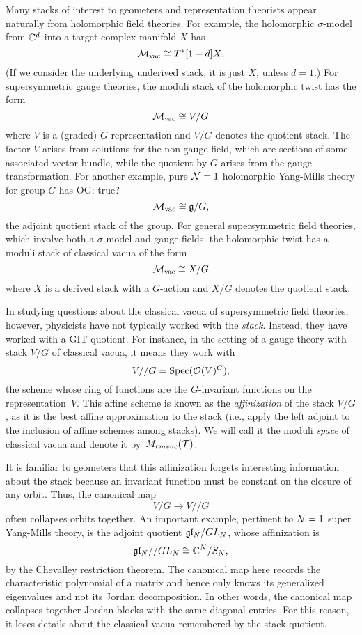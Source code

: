 \documentclass[11pt]{amsart}
\def\Spec{\text{Spec}}
\def\owen#1{{\textcolor{violet!65!black}{OG: {#1}}}}
\begin{document}
Many stacks of interest to geometers and representation theorists appear naturally from holomorphic field theories.
For example, the holomorphic $\sigma$-model from $\mathbb C^d$ into a target complex manifold $X$ has
\[
\mathcal M_{\rm vac} \cong T^*[1-d]X.
\]
(If we consider the underlying underived stack, it is just $X$, unless $d = 1$.)
For supersymmetric gauge theories, the moduli stack of the holomorphic twist has the form
\[
\mathcal M_{\rm vac} \cong V/G
\]
where $V$ is a (graded) $G$-representation and $V/G$ denotes the quotient stack.
The factor $V$ arises from solutions for the non-gauge field, which are sections of some associated vector bundle,
while the quotient by $G$ arises from the gauge transformation.
For another example, pure $\mathcal N =1$ holomorphic Yang-Mills theory for group $G$ has \owen{true?}
\[
\mathcal M_{\rm vac} \cong \mathfrak g/G,
\]
the adjoint quotient stack of the group.
For general supersymmetric field theories, which involve both a $\sigma$-model and gauge fields, the holomorphic twist has a moduli stack of classical vacua of the form
\[
\mathcal M_{\rm vac} \cong X/G
\]
where $X$ is a derived stack with a $G$-action and $X/G$ denotes the quotient stack.

In studying questions about the classical vacua of supersymmetric field theories, however, physicists have not typically worked with the {\em stack}.
Instead, they have worked with a GIT quotient.
For instance, in the setting of a gauge theory with stack $V/G$ of classical vacua, it means they work with
\[
V//G = \Spec(\cO(V)^G),
\]
the scheme whose ring of functions are the $G$-invariant functions on the representation~$V$.
This affine scheme is known as the {\em affinization} of the stack $V/G$, as it is the best affine approximation to the stack (i.e., apply the left adjoint to the inclusion of affine schemes among stacks).
We will call it the moduli {\em space} of classical vacua and denote it by~$M_{rm vac}(\mathcal T)$.

It is familiar to geometers that this affinization forgets interesting information about the stack because an invariant function must be constant on the closure of any orbit.
Thus, the canonical map
\[
V/G \to V//G
\]
often collapses orbits together.
An important example, pertinent to $\mathcal N =1$ super Yang-Mills theory, is the adjoint quotient $\mathfrak{g} \mathfrak{l}_N/ GL_N$, whose affinization is
\[
\mathfrak{g} \mathfrak{l}_N//GL_N \cong \mathbb C^N/S_N,
\]
by the Chevalley restriction theorem.
The canonical map here records the characteristic polynomial of a matrix and hence only knows its generalized eigenvalues and not its Jordan decomposition.
In other words, the canonical map collapses together Jordan blocks with the same diagonal entries.
For this reason, it loses details about the classical vacua remembered by the stack quotient.
\end{document}
